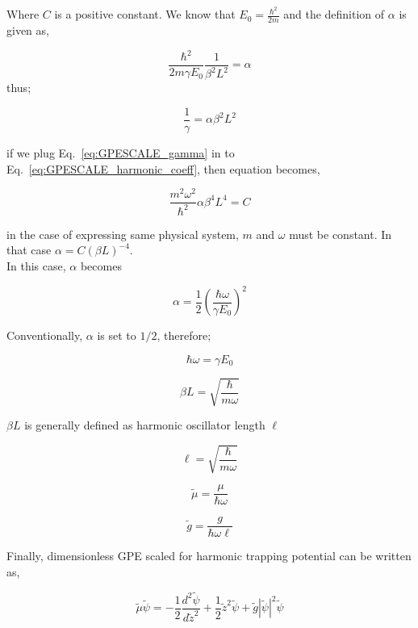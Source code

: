 \documentclass[a4paper,times,12pt]{article}
\begin{document}
Where $C$ is a positive constant. We know that $E_0 = \frac{\hbar^2}{2m}$ and the definition of $\alpha$ is given as,

\begin{equation}
\label{eq:GPESCALE_alpha}
    \frac{\hbar^2}{2m\gamma E_0} \frac{1}{\beta^2 L^2} = \alpha
\end{equation}
thus;

\begin{equation}
\label{eq:GPESCALE_gamma}
     \frac{1}{\gamma} = \alpha \beta^2 L^2
\end{equation}

if we plug Eq.~\eqref{eq:GPESCALE_gamma} in to Eq.~\eqref{eq:GPESCALE_harmonic_coeff}, then equation becomes,

\begin{equation}
\label{eq:GPESCALE_harmonic_coeff_2}
    \frac{m^2\omega^2}{\hbar^2} \alpha \beta^4 L^4 = C 
\end{equation} 

in the case of expressing same physical system, $m$ and $\omega$ must be constant. In that case $\alpha = C (\beta L)^{-4}$.\\


In this case, $\alpha$ becomes

$$ \alpha =  \frac{1}{2} \left(\frac{\hbar \omega}{\gamma E_0}\right)^2 $$

Conventionally, $\alpha$ is set to $1/2$, therefore;

$$ \hbar \omega = \gamma E_0 $$

$$ \beta L = \sqrt{\frac{\hbar}{m\omega}} $$ 

$ \beta L $ is generally defined as harmonic oscillator length $\ell$

$$ \ell = \sqrt{\frac{\hbar}{m\omega}} $$ 

$$ \widetilde{\mu} = \frac{\mu}{\hbar \omega} $$ 

$$ \widetilde{g} = \frac{g}{\hbar \omega \ell} $$

Finally, dimensionless GPE scaled for harmonic trapping potential can be written as,

$$\widetilde{\mu} \widetilde{\psi} = -\frac{1}{2}\frac{d^2\widetilde{\psi}}{d\widetilde{z}^2} + \frac{1}{2}\widetilde{z}^2\widetilde{\psi} + \widetilde{g}|\widetilde{\psi}|^2 \widetilde{\psi} $$
\end{document}
